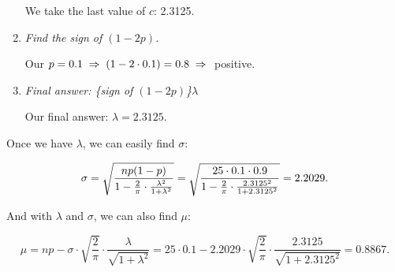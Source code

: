 \documentclass{article}
\begin{document}
\begin{enumerate}
    We take the last value of $c$: 2.3125.

  \item \textit{Find the sign of $(1-2p)$.}

    Our $p = 0.1 \;\Rightarrow\; (1 - 2\cdot0.1) = 0.8 \;\Rightarrow\;$ positive.

  \item \textit{Final answer: \{sign of $(1-2p)$\}$\lambda$}

    Our final answer: $\lambda = 2.3125$.
\end{enumerate}

Once we have $\lambda$, we can easily find $\sigma$:

\begin{equation*}
  \sigma = \sqrt{\frac{np(1-p)}{1 - \frac{2}{\pi} \cdot \frac{\lambda^2}{1 + \lambda^2}}} = \sqrt{\frac{25 \cdot 0.1 \cdot 0.9}{1 - \frac{2}{\pi} \cdot \frac{2.3125^2}{1 + 2.3125^2}}} = 2.2029. \\
\end{equation*}

And with $\lambda$ and $\sigma$, we can also find $\mu$:

\begin{equation*}
  \mu = np - \sigma \cdot \sqrt{\frac{2}{\pi}} \cdot \frac{\lambda}{\sqrt{1 + \lambda^2}} = 25 \cdot 0.1 - 2.2029 \cdot \sqrt{\frac{2}{\pi}} \cdot \frac{2.3125}{\sqrt{1 + 2.3125^2}} = 0.8867.
\end{equation*}

\clearpage


\end{document}
